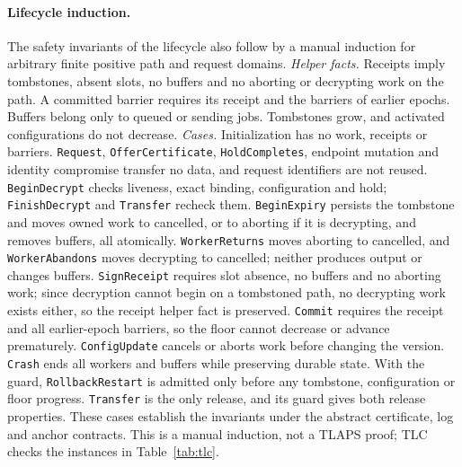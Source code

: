 \documentclass[pdflatex,sn-mathphys-num]{sn-jnl}
\newcommand{\code}[1]{\texttt{#1}}
\theoremstyle{plain}
\begin{document}
\paragraph{Lifecycle induction.}
The safety invariants of the lifecycle also follow by a manual induction for arbitrary finite positive path and request domains.
\emph{Helper facts.} Receipts imply tombstones, absent slots, no buffers and no aborting or decrypting work on the path. A committed barrier requires its receipt and the barriers of earlier epochs. Buffers belong only to queued or sending jobs. Tombstones grow, and activated configurations do not decrease.
\emph{Cases.} Initialization has no work, receipts or barriers. \code{Request}, \code{OfferCertificate}, \code{HoldCompletes}, endpoint mutation and identity compromise transfer no data, and request identifiers are not reused. \code{BeginDecrypt} checks liveness, exact binding, configuration and hold; \code{FinishDecrypt} and \code{Transfer} recheck them. \code{BeginExpiry} persists the tombstone and moves owned work to cancelled, or to aborting if it is decrypting, and removes buffers, all atomically. \code{WorkerReturns} moves aborting to cancelled, and \code{WorkerAbandons} moves decrypting to cancelled; neither produces output or changes buffers. \code{SignReceipt} requires slot absence, no buffers and no aborting work; since decryption cannot begin on a tombstoned path, no decrypting work exists either, so the receipt helper fact is preserved. \code{Commit} requires the receipt and all earlier-epoch barriers, so the floor cannot decrease or advance prematurely. \code{ConfigUpdate} cancels or aborts work before changing the version. \code{Crash} ends all workers and buffers while preserving durable state. With the guard, \code{RollbackRestart} is admitted only before any tombstone, configuration or floor progress. \code{Transfer} is the only release, and its guard gives both release properties.
These cases establish the invariants under the abstract certificate, log and anchor contracts. This is a manual induction, not a TLAPS proof; TLC checks the instances in Table~\ref{tab:tlc}.
\end{document}
